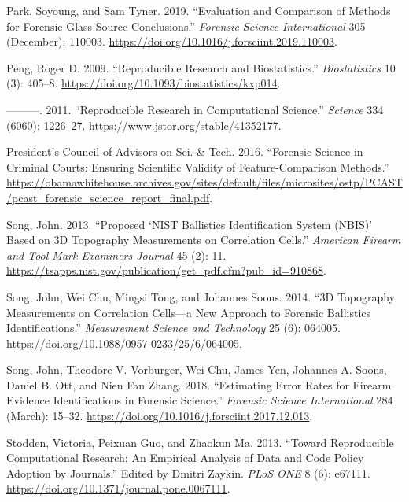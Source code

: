 \begin{CSLReferences}{1}{0}
\leavevmode{}%
Park, Soyoung, and Sam Tyner. 2019. {``Evaluation and Comparison of Methods for Forensic Glass Source Conclusions.''} \emph{Forensic Science International} 305 (December): 110003. \url{https://doi.org/10.1016/j.forsciint.2019.110003}.

\leavevmode{}%
Peng, Roger D. 2009. {``Reproducible Research and {Biostatistics}.''} \emph{Biostatistics} 10 (3): 405--8. \url{https://doi.org/10.1093/biostatistics/kxp014}.

\leavevmode{}%
---------. 2011. {``Reproducible {Research} in {Computational} {Science}.''} \emph{Science} 334 (6060): 1226--27. \url{https://www.jstor.org/stable/41352177}.

\leavevmode{}%
President's Council of Advisors on Sci. \& Tech. 2016. {``Forensic Science in Criminal Courts: Ensuring Scientific Validity of Feature-Comparison Methods.''} \url{https://obamawhitehouse.archives.gov/sites/default/files/microsites/ostp/PCAST/pcast_forensic_science_report_final.pdf}.

\leavevmode{}%
Song, John. 2013. {``Proposed {`{NIST} {Ballistics} {Identification} {System} ({NBIS})'} {Based} on {3D} {Topography} {Measurements} on {Correlation} {Cells}.''} \emph{American Firearm and Tool Mark Examiners Journal} 45 (2): 11. \url{https://tsapps.nist.gov/publication/get_pdf.cfm?pub_id=910868}.

\leavevmode{}%
Song, John, Wei Chu, Mingsi Tong, and Johannes Soons. 2014. {``{3D} Topography Measurements on Correlation Cells---a New Approach to Forensic Ballistics Identifications.''} \emph{Measurement Science and Technology} 25 (6): 064005. \url{https://doi.org/10.1088/0957-0233/25/6/064005}.

\leavevmode{}%
Song, John, Theodore V. Vorburger, Wei Chu, James Yen, Johannes A. Soons, Daniel B. Ott, and Nien Fan Zhang. 2018. {``Estimating Error Rates for Firearm Evidence Identifications in Forensic Science.''} \emph{Forensic Science International} 284 (March): 15--32. \url{https://doi.org/10.1016/j.forsciint.2017.12.013}.

\leavevmode{}%
Stodden, Victoria, Peixuan Guo, and Zhaokun Ma. 2013. {``Toward {Reproducible} {Computational} {Research}: {An} {Empirical} {Analysis} of {Data} and {Code} {Policy} {Adoption} by {Journals}.''} Edited by Dmitri Zaykin. \emph{PLoS ONE} 8 (6): e67111. \url{https://doi.org/10.1371/journal.pone.0067111}.


\end{CSLReferences}
